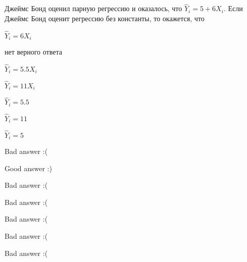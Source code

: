 
\begin{question}
Джеймс Бонд оценил парную регрессию и оказалось,
что \(\hat Y_i = 5 + 6 X_i\).
Если Джеймс Бонд оценит регрессию без константы, то окажется, что
\begin{answerlist}
  \item \(\hat Y_i = 6 X_i\)
  \item нет верного ответа
  \item \(\hat Y_i = 5.5 X_i\)
  \item \(\hat Y_i = 11 X_i\)
  \item \(\hat Y_i = 5.5\)
  \item \(\hat Y_i = 11\)
  \item \(\hat Y_i = 5\)
\end{answerlist}
\end{question}

\begin{solution}
\begin{answerlist}
  \item Bad answer :(
  \item Good answer :)
  \item Bad answer :(
  \item Bad answer :(
  \item Bad answer :(
  \item Bad answer :(
  \item Bad answer :(
\end{answerlist}
\end{solution}

